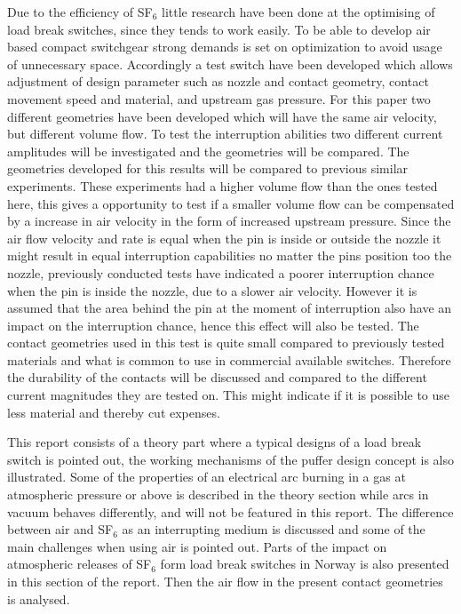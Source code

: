 \documentclass[10pt,a4paper,twoside]{article}
\begin{document}
Due to the efficiency of SF$_6$ little research have been done at the optimising of load break switches, since they tends to work easily. To be able to develop air based compact switchgear strong demands is set on optimization to avoid usage of unnecessary space. Accordingly a test switch have been developed which allows adjustment of design parameter such as nozzle and contact geometry, contact movement speed and material, and upstream gas pressure. For this paper two different geometries have been developed which will have the same air velocity, but different volume flow. To test the interruption abilities two different current amplitudes will be investigated and the geometries will be compared. The geometries developed for this results will be compared to previous similar experiments. These experiments had a higher volume flow than the ones tested here, this gives a opportunity to test if a smaller volume flow can be compensated by a increase in air velocity in the form of increased upstream pressure. Since the air flow velocity and rate is equal when the pin is inside or outside the nozzle it might result in equal interruption capabilities no matter the pins position too the nozzle, previously conducted tests have indicated a poorer interruption chance when the pin is inside the nozzle, due to a slower air velocity. However it is assumed that the area behind the pin at the moment of interruption also have an impact on the interruption chance, hence this effect will also be tested. The contact geometries used in this test is quite small compared to previously tested materials and what is common to use in commercial available switches. Therefore the durability of the contacts will be discussed and compared to the different current magnitudes they are tested on. This might indicate if it is possible to use less material and thereby cut expenses.

This report consists of a theory part where a typical designs of a load break switch is pointed out, the working mechanisms of the puffer design concept is also illustrated. Some of the properties of an electrical arc burning in a gas at atmospheric pressure or above is described in the theory section while arcs in vacuum behaves differently, and will not be featured in this report. The difference between air and SF$_6$ as an interrupting medium is discussed and some of the main challenges when using air is pointed out. Parts of the impact on atmospheric releases of SF$_6$ form load break switches in Norway is also presented in this section of the report. Then the air flow in the present contact geometries is analysed.
\end{document}
